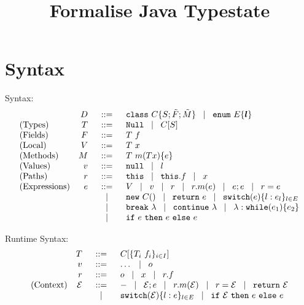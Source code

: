 \documentclass[a4paper]{llncs}
\title{Formalise Java Typestate}
\author{}
\newcommand{\class}{\ensuremath{\mathtt{class}}\xspace}
\newcommand{\enum}{\ensuremath{\mathtt{enum}}\xspace}
\newcommand{\Null}{\ensuremath{\mathtt{Null}}\xspace}
\newcommand{\nul}{\ensuremath{\mathtt{null}}\xspace}
\newcommand{\this}{\ensuremath{\mathtt{this}}\xspace}
\newcommand{\brk}[1]{\ensuremath{\mathtt{break}}\ #1}
\newcommand{\continue}[1]{\ensuremath{\mathtt{continue}}\ #1}
\newcommand{\return}[1]{\ensuremath{\mathtt{return}}\ #1}
\newcommand{\ctype}[2]{#1[#2]}
\newcommand{\base}{\ensuremath{\mathtt{base}}\xspace}
\newcommand{\method}[4]{#1\ #2(#3)\set{#4}}
\newcommand{\vdecl}[2]{#1\ #2}
\newcommand{\mcall}[2]{#1(#2)}
\newcommand{\newo}[1]{\ensuremath{\mathtt{new}\ #1()}}
\newcommand{\switch}[2]{\ensuremath{\mathtt{switch}(#1)\set{#2}}}
\newcommand{\while}[2]{\ensuremath{\mathtt{while}(#1)\set{#2}}}
\begin{document}
	\maketitle


\section{Syntax}
	Syntax:
\[
	\begin{array}{lrcl}
		&D &\bnfis& \class\ C \set{S; \vect{F}; \vect{M}} \bnfbar \enum\ E \set{\vec{l}}\\
		\textrm{(Types)} & T &\bnfis& \Null \bnfbar \ctype{C}{S}\\%
		\textrm{(Fields)} &F &\bnfis& \vdecl{T}{f}\\		
		\textrm{(Local)} &V &\bnfis& \vdecl{T}{x}\\
		\textrm{(Methods)} &M &\bnfis& \method{T}{m}{T x}{e}\\
		\textrm{(Values)} &v& \bnfis& \nul \bnfbar l\\
		\textrm{(Paths)}  &r& \bnfis & \this \bnfbar \this.f \bnfbar x\\
		\textrm{(Expressions)} &e& \bnfis & V \bnfbar v \bnfbar r \bnfbar r.\mcall{m}{e} \bnfbar e;e \bnfbar r = e\\
		&&\bnfbar & \newo{C} \bnfbar \return{e} \bnfbar \switch{e}{l : e_l}_{l \in E} \\
		&&\bnfbar & \brk{\lambda} \bnfbar \continue \lambda \bnfbar{\lambda}: \while{e_1}{e_2}\\
		&&\bnfbar & \ifthenelse{e}{e}{e}
	\end{array}
\]

	Runtime Syntax:
\[
	\begin{array}{lrcl}
		& T & \bnfis & C[\set{T_i\ f_i}_{i \in I}]\\
		& v & \bnfis & \dots \bnfbar o\\
		& r & \bnfis & o \bnfbar x \bnfbar r.f \\
		\textrm{(Context)} & \mathcal{E} &\bnfis& \hole \bnfbar \mathcal{E}; e \bnfbar r.m(\mathcal{E}) \bnfbar r = \mathcal{E}
				\bnfbar \return{\mathcal{E}}\\
				&&\bnfbar& \switch{\mathcal{E}}{l:e}_{l \in E} \bnfbar \ifthenelse{\mathcal{E}}{e}{e}
	\end{array}
\]

%
%
\end{document}
